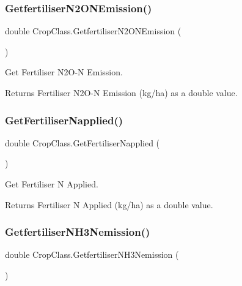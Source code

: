 \subsubsection{\texorpdfstring{GetfertiliserN2ONEmission()}{GetfertiliserN2ONEmission()}}
{\footnotesize\ttfamily double Crop\+Class.\+Getfertiliser\+N2\+O\+N\+Emission (\begin{DoxyParamCaption}{ }\end{DoxyParamCaption})\hspace{0.3cm}{\ttfamily [inline]}}



Get Fertiliser N2\+O-\/N Emission. 

\begin{DoxyReturn}{Returns}
Fertiliser N2\+O-\/N Emission (kg/ha) as a double value. 
\end{DoxyReturn}
\mbox{\label{class_crop_class_abe4a417408aeebaa65788c105f86d735}} 
\subsubsection{\texorpdfstring{GetFertiliserNapplied()}{GetFertiliserNapplied()}}
{\footnotesize\ttfamily double Crop\+Class.\+Get\+Fertiliser\+Napplied (\begin{DoxyParamCaption}{ }\end{DoxyParamCaption})\hspace{0.3cm}{\ttfamily [inline]}}



Get Fertiliser N Applied. 

\begin{DoxyReturn}{Returns}
Fertiliser N Applied (kg/ha) as a double value. 
\end{DoxyReturn}
\mbox{\label{class_crop_class_afb4a450cc031ece2cb19055ce77f0be4}} 
\subsubsection{\texorpdfstring{GetfertiliserNH3Nemission()}{GetfertiliserNH3Nemission()}}
{\footnotesize\ttfamily double Crop\+Class.\+Getfertiliser\+N\+H3\+Nemission (\begin{DoxyParamCaption}{ }\end{DoxyParamCaption})\hspace{0.3cm}{\ttfamily [inline]}}



